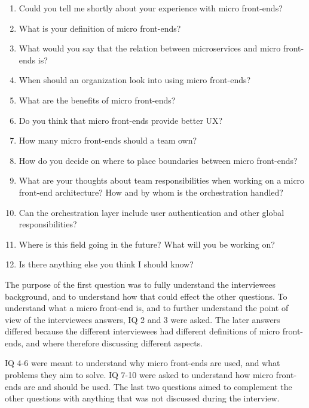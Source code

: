 {
\begin{enumerate}
\item Could you tell me shortly about your experience with micro front-ends?

\item What is your definition of micro front-ends?

\item What would you say that the relation between microservices and micro front-ends is?

\item When should an organization look into using micro front-ends?

\item What are the benefits of micro front-ends?

\item Do you think that micro front-ends provide better UX?

\item How many micro front-ends should a team own?

\item How do you decide on where to place boundaries between micro front-ends?

\item What are your thoughts about team responsibilities when working on a micro front-end architecture? How and by whom is the orchestration handled?

\item Can the orchestration layer include user authentication and other global responsibilities?

\item Where is this field going in the future? What will you be working on?

\item Is there anything else you think I should know?
\end{enumerate}
}

The purpose of the first question was to fully understand the interviewees background, and to understand how that could effect the other questions. To understand what a micro front-end is, and to further understand the point of view of the interviewees answers, IQ 2 and 3 were asked. The later answers differed because the different interviewees had different definitions of micro front-ends, and where therefore discussing different aspects.

IQ 4-6 were meant to understand why micro front-ends are used, and what problems they aim to solve. IQ 7-10 were asked to understand how micro front-ends are and should be used. The last two questions aimed to complement the other questions with anything that was not discussed during the interview.

